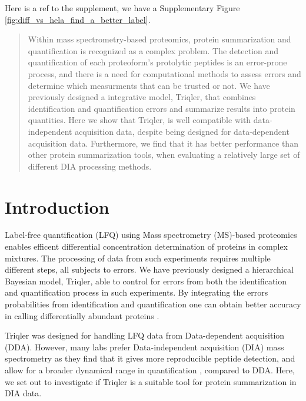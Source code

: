 \documentclass[10pt,letterpaper]{article}
\begin{document}
\maketitle


Here is a ref to the supplement, we have a Supplementary Figure \ref{fig:diff_vs_hela_find_a_better_label}.

\begin{abstract}

Within mass spectrometry-based proteomics, protein summarization and quantification is recognized as a complex problem. The detection and quantification of each proteoform's protolytic peptides is an error-prone process, and there is a need for computational methods to assess errors and determine which measurments that can be trusted or not.  We have previously designed a integrative model, Triqler, that combines identification and quantification errors and summarize results into protein quantities. 
Here we show that Triqler, is well compatible with data-independent acquisition data, despite being designed for data-dependent acquisition data. Furthermore, we find that it has better performance than other protein summarization tools, when evaluating a relatively large set of different DIA processing methods. 

\end{abstract}
  

\section*{Introduction}

Label-free quantification (LFQ) using Mass spectrometry (MS)-based proteomics enables efficent differential concentration determination of proteins in complex mixtures. The processing of data from such experiments requires multiple different steps, all subjects to errors. We have previously designed a hierarchical Bayesian model, Triqler, able to control for errors from both the identification and quantification process in such experiments\cite{The2018Integrated}. By integrating the errors probabilities from identification and quantification one can obtain better accuracy in calling differentially abundant proteins \cite{The2018Integrated}.   

Triqler was designed for handling LFQ data from Data-dependent acquisition (DDA). However, many labs prefer Data-independent acquisition (DIA) mass spectrometry \cite{venable2004automated} as they find that it gives more reproducible peptide detection, and allow for a broader dynamical range in quantification \cite{bern2010deconvolution,zhang2020DIA}, compared to DDA. Here, we set out to investigate if Triqler is a suitable tool for protein summarization in DIA data.
\end{document}
